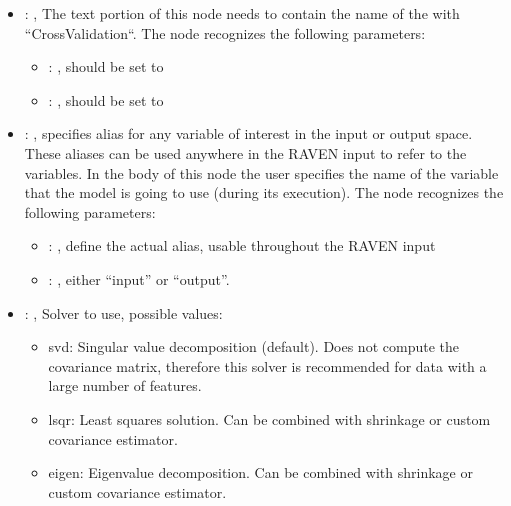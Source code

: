 \begin{itemize}
\begin{itemize}
        \item {}: ,
          List of IDs of features/variables to include in the transformation process.

        \item {}: ,
          Which space to search? Target or Feature?
      \end{itemize}

    \item {}: ,
      The text portion of this node needs to contain the name of the  with
               ``CrossValidation``.
      The  node recognizes the following parameters:
        \begin{itemize}
          \item {}: ,
            should be set to 
          \item {}: ,
            should be set to 
      \end{itemize}

    \item {}: ,
      specifies alias for         any variable of interest in the input or output space. These
      aliases can be used anywhere in the RAVEN input to         refer to the variables. In the body
      of this node the user specifies the name of the variable that the model is going to use
      (during its execution).
      The  node recognizes the following parameters:
        \begin{itemize}
          \item {}: ,
            define the actual alias, usable throughout the RAVEN input
          \item {}: ,
            either ``input'' or ``output''.
      \end{itemize}

    \item {}: ,
      Solver to use, possible values:
      \begin{itemize}                                                    \item svd: Singular value
      decomposition (default). Does not compute the covariance matrix,
      therefore this solver is recommended for data with a large number of features.
      \item lsqr: Least squares solution. Can be combined with shrinkage or custom covariance
      estimator.                                                    \item eigen: Eigenvalue
      decomposition. Can be combined with shrinkage or custom covariance estimator.
      \end{itemize}


\end{itemize}
